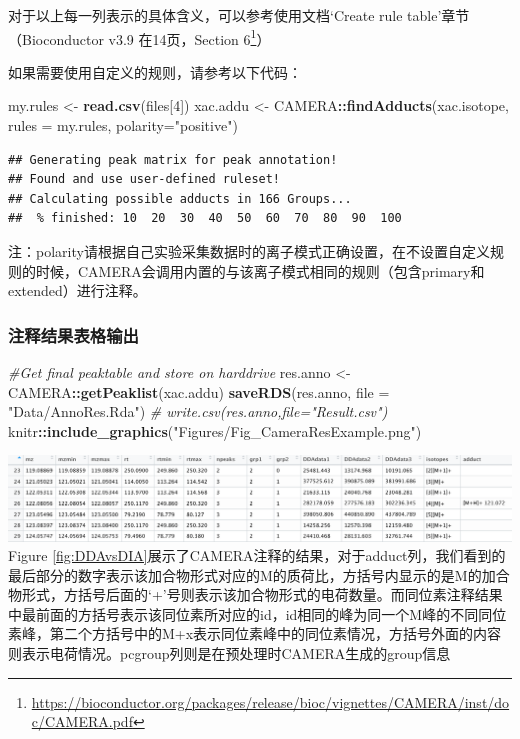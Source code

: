 \documentclass[]{ctexbook}
\newenvironment{Shaded}{\begin{snugshade}}{\end{snugshade}}
\newcommand{\CommentTok}[1]{\textcolor[rgb]{0.56,0.35,0.01}{\textit{#1}}}
\newcommand{\DataTypeTok}[1]{\textcolor[rgb]{0.13,0.29,0.53}{#1}}
\newcommand{\DecValTok}[1]{\textcolor[rgb]{0.00,0.00,0.81}{#1}}
\newcommand{\KeywordTok}[1]{\textcolor[rgb]{0.13,0.29,0.53}{\textbf{#1}}}
\newcommand{\NormalTok}[1]{#1}
\newcommand{\OperatorTok}[1]{\textcolor[rgb]{0.81,0.36,0.00}{\textbf{#1}}}
\newcommand{\StringTok}[1]{\textcolor[rgb]{0.31,0.60,0.02}{#1}}
\renewcommand{\href}[2]{#2\footnote{\url{#1}}}
\begin{document}
对于以上每一列表示的具体含义，可以参考使用文档`Create rule table'章节（Bioconductor v3.9 在14页，\href{https://bioconductor.org/packages/release/bioc/vignettes/CAMERA/inst/doc/CAMERA.pdf}{Section 6}）

如果需要使用自定义的规则，请参考以下代码：

\begin{Shaded}
\begin{Highlighting}[]
\NormalTok{my.rules <-}\StringTok{ }\KeywordTok{read.csv}\NormalTok{(files[}\DecValTok{4}\NormalTok{])}
\NormalTok{xac.addu <-}\StringTok{ }\NormalTok{CAMERA}\OperatorTok{::}\KeywordTok{findAdducts}\NormalTok{(xac.isotope, }\DataTypeTok{rules =}\NormalTok{ my.rules, }\DataTypeTok{polarity=}\StringTok{"positive"}\NormalTok{)}
\end{Highlighting}
\end{Shaded}

\begin{verbatim}
## Generating peak matrix for peak annotation!
## Found and use user-defined ruleset!
## Calculating possible adducts in 166 Groups... 
##  % finished: 10  20  30  40  50  60  70  80  90  100
\end{verbatim}

注：polarity请根据自己实验采集数据时的离子模式正确设置，在不设置自定义规则的时候，CAMERA会调用内置的与该离子模式相同的规则（包含primary和extended）进行注释。

\subsubsection{注释结果表格输出}

\begin{Shaded}
\begin{Highlighting}[]
\CommentTok{#Get final peaktable and store on harddrive}
\NormalTok{res.anno <-}\StringTok{ }\NormalTok{CAMERA}\OperatorTok{::}\KeywordTok{getPeaklist}\NormalTok{(xac.addu)}
\KeywordTok{saveRDS}\NormalTok{(res.anno, }\DataTypeTok{file =} \StringTok{"Data/AnnoRes.Rda"}\NormalTok{)}
\CommentTok{# write.csv(res.anno,file="Result.csv")}
\NormalTok{knitr}\OperatorTok{::}\KeywordTok{include_graphics}\NormalTok{(}\StringTok{"Figures/Fig_CameraResExample.png"}\NormalTok{)}
\end{Highlighting}
\end{Shaded}

\includegraphics{Figures/Fig_CameraResExample.png}
Figure \ref{fig:DDAvsDIA}展示了CAMERA注释的结果，对于adduct列，我们看到的最后部分的数字表示该加合物形式对应的M的质荷比，方括号内显示的是M的加合物形式，方括号后面的`+'号则表示该加合物形式的电荷数量。而同位素注释结果中最前面的方括号表示该同位素所对应的id，id相同的峰为同一个M峰的不同同位素峰，第二个方括号中的M+x表示同位素峰中的同位素情况，方括号外面的内容则表示电荷情况。pcgroup列则是在预处理时CAMERA生成的group信息
\end{document}

